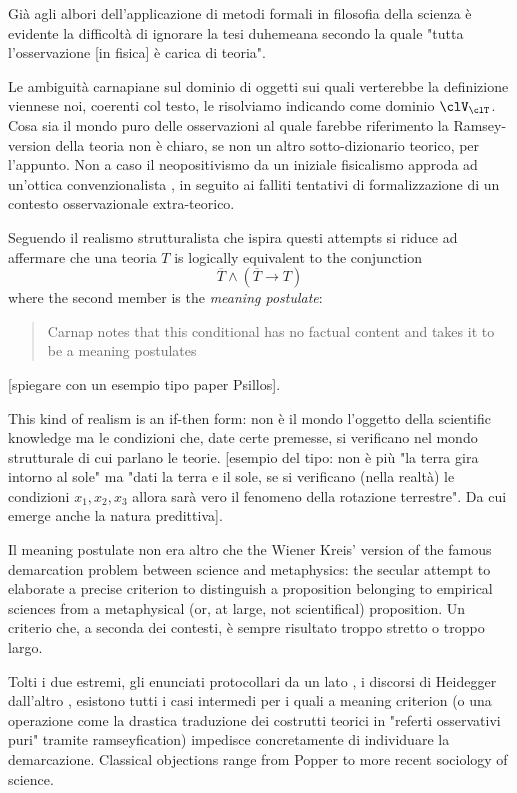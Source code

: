 Già agli albori dell'applicazione di metodi formali in filosofia della scienza è evidente la difficoltà di ignorare la tesi duhemeana secondo la quale "tutta l'osservazione [in fisica] è carica di teoria". 

Le ambiguità carnapiane sul dominio di oggetti sui quali verterebbe la definizione viennese noi, coerenti col testo, le risolviamo indicando come dominio $\clV_\clT$. Cosa sia il mondo puro delle osservazioni al quale farebbe riferimento la Ramsey-version della teoria non è chiaro, se non un altro sotto-dizionario teorico, per l'appunto. Non a caso il neopositivismo da un iniziale fisicalismo approda ad un'ottica convenzionalista \cite{?}, in seguito ai falliti tentativi di formalizzazione di un contesto osservazionale extra-teorico. 

Seguendo \cite{psillos} il realismo strutturalista che ispira questi attempts si riduce ad affermare che una teoria $T$ is logically equivalent to the conjunction
\[\overline{T} \land (\overline{T} \rightarrow T)
\] where the second member is the \emph{meaning postulate}:
\begin{quotation}
	Carnap notes that this conditional has no factual content and takes it to be a meaning postulates \cite{psillos}
\end{quotation}
[spiegare con un esempio tipo paper Psillos].

This kind of realism is an if-then form: non è il mondo l'oggetto della scientific knowledge ma le condizioni che, date certe premesse, si verificano nel mondo strutturale di cui parlano le teorie. [esempio del tipo: non è più "la terra gira intorno al sole" ma "dati la terra e il sole, se si verificano (nella realtà) le condizioni $x_1,x_2,x_3$ allora sarà vero il fenomeno della rotazione terrestre". Da cui emerge anche la natura predittiva]. 

Il meaning postulate non era altro che the Wiener Kreis' version of the famous demarcation problem between science and metaphysics: the secular attempt to elaborate a precise criterion to distinguish a proposition belonging to empirical sciences from a metaphysical (or, at large, not scientifical) proposition. Un criterio che, a seconda dei contesti, è sempre risultato troppo stretto o troppo largo. 

Tolti i due estremi, gli enunciati protocollari da un lato \cite{?}, i discorsi di Heidegger dall'altro \cite{?}, esistono tutti i casi intermedi per i quali a meaning criterion (o una operazione come la drastica traduzione dei costrutti teorici in "referti osservativi puri" tramite ramseyfication) impedisce concretamente di individuare la demarcazione. Classical objections range from Popper \cite{?} to more recent sociology of science.

